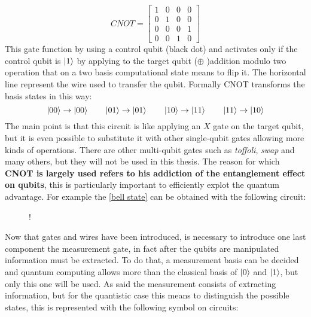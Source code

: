 \begin{equation*}
	CNOT = 
	\begin{bmatrix}
		1 & 0 & 0 & 0 \\
		0 & 1 & 0 & 0 \\
		0 & 0 & 0 & 1 \\
		0 & 0 & 1 & 0
	\end{bmatrix}
\end{equation*} 
This gate function by using a control qubit (black dot) and activates only if the control qubit is $\ket{1}$ by applying to the target qubit ($\oplus$ )addition modulo two operation that on a two basis computational state means to flip it. The horizontal line represent the wire used to transfer the qubit. Formally CNOT transforms the basis states in this way:
\begin{equation*}
	\ket{00} \to \ket{00} \qquad \ket{01} \to \ket{01} \qquad \ket{10} \to \ket{11} \qquad \ket{11} \to \ket{10}
\end{equation*}
The main point is that this circuit is like applying an $X$ gate on the target qubit, but it is even possible to substitute it with other single-qubit gates allowing more kinds of operations. There are other multi-qubit gates such as \textit{toffoli}, \textit{swap} and many others, but they will not be used in this thesis.
The reason for which \textbf{CNOT is largely used refers to his addiction of the entanglement effect on qubits}, this is particularly important to efficiently explot the quantum advantage. For example the \ref{bell state} can be obtained with the following circuit:
\begin{figure}[H]
	\centering
	\resizebox {0.5\linewidth} {!} {
	}
	\label{bell circuit}
\end{figure}
Now that gates and wires have been introduced, is necessary to introduce one last component the measurement gate, in fact after the qubits are manipulated information must be extracted. 
To do that, a measurement basis can be decided and quantum computing allows more than the classical basis of $\ket{0}$ and $\ket{1}$, but only this one will be used. As said the measurement consists of extracting information, but for the quantistic case this means to distinguish the possible states, this is represented with the following symbol on circuits:
